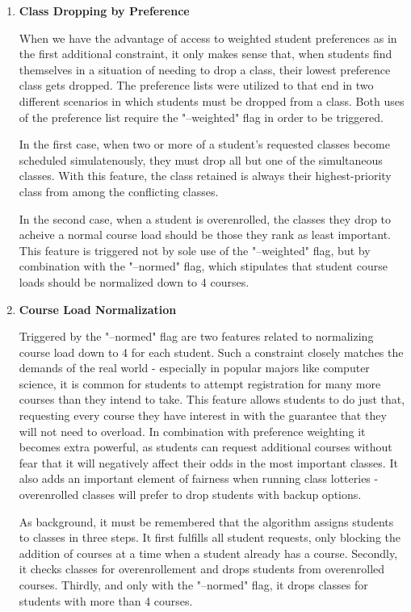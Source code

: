 \documentclass[11pt, oneside]{article}   	%
\begin{document}
\begin{enumerate}
\item{\textbf{Class Dropping by Preference}}

When we have the advantage of access to weighted student preferences as in the first additional constraint, it only makes sense that, when students find themselves in a situation of needing to drop a class, their lowest preference class gets dropped. The preference lists were utilized to that end in two different scenarios in which students must be dropped from a class. Both uses of the preference list require the "--weighted" flag in order to be triggered. 

In the first case, when two or more of a student's requested classes become scheduled simulatenously, they must drop all but one of the simultaneous classes. With this feature, the class retained is always their highest-priority class from among the conflicting classes.

In the second case, when a student is overenrolled, the classes they drop to acheive a normal course load should be those they rank as least important. This feature is triggered not by sole use of the "--weighted" flag, but by combination with the "--normed" flag, which stipulates that student course loads should be normalized down to 4 courses.

\item{\textbf{Course Load Normalization}}

Triggered by the "--normed" flag are two features related to normalizing course load down to 4 for each student. Such a constraint closely matches the demands of the real world - especially in popular majors like computer science, it is common for students to attempt registration for many more courses than they intend to take. This feature allows students to do just that, requesting every course they have interest in with the guarantee that they will not need to overload. In combination with preference weighting it becomes extra powerful, as students can request additional courses without fear that it will negatively affect their odds in the most important classes. It also adds an important element of fairness when running class lotteries - overenrolled classes will prefer to drop students with backup options.

As background, it must be remembered that the algorithm assigns students to classes in three steps. It first fulfills all student requests, only blocking the addition of courses at a time when a student already has a course. Secondly, it checks classes for overenrollement and drops students from overenrolled courses. Thirdly, and only with the "--normed" flag, it drops classes for students with more than 4 courses.


\end{enumerate}
\end{document}
